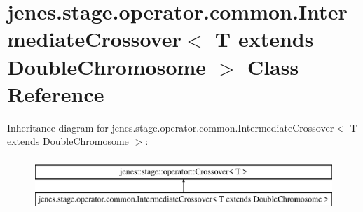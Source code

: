 \hypertarget{classjenes_1_1stage_1_1operator_1_1common_1_1_intermediate_crossover_3_01_t_01extends_01_double_chromosome_01_4}{\section{jenes.\-stage.\-operator.\-common.\-Intermediate\-Crossover$<$ T extends Double\-Chromosome $>$ Class Reference}
\label{classjenes_1_1stage_1_1operator_1_1common_1_1_intermediate_crossover_3_01_t_01extends_01_double_chromosome_01_4}
}
Inheritance diagram for jenes.\-stage.\-operator.\-common.\-Intermediate\-Crossover$<$ T extends Double\-Chromosome $>$\-:\begin{figure}[H]
\begin{center}
\leavevmode
\includegraphics[height=2.000000cm]{classjenes_1_1stage_1_1operator_1_1common_1_1_intermediate_crossover_3_01_t_01extends_01_double_chromosome_01_4}
\end{center}
\end{figure}
